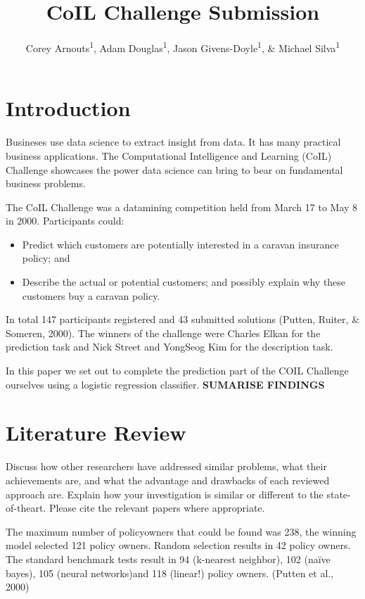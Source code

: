 \documentclass[man]{apa6}
\title{CoIL Challenge Submission}
\author{Corey Arnouts\textsuperscript{1}, Adam Douglas\textsuperscript{1}, Jason Givens-Doyle\textsuperscript{1}, \& Michael Silva\textsuperscript{1}}
\date{}
\affiliation{
\vspace{0.5cm}
\textsuperscript{1} CUNY School of Professional Studies}
\providecommand{\tightlist}{%
  \setlength{\itemsep}{0pt}\setlength{\parskip}{0pt}}
\begin{document}
\maketitle

\hypertarget{introduction}{%
\section{Introduction}\label{introduction}}

Busineses use data science to extract insight from data. It has many practical business applications. The Computational Intelligence and Learning (CoIL) Challenge showcases the power data science can bring to bear on fundamental business problems.

The CoIL Challenge was a datamining competition held from March 17 to May 8 in 2000. Participants could:

\begin{itemize}
\tightlist
\item
  Predict which customers are potentially interested in a caravan insurance policy; and
\item
  Describe the actual or potential customers; and possibly explain why these customers buy a caravan policy.
\end{itemize}

In total 147 participants registered and 43 submitted solutions (Putten, Ruiter, \& Someren, 2000). The winners of the challenge were Charles Elkan for the prediction task and Nick Street and YongSeog Kim for the description task.

In this paper we set out to complete the prediction part of the COIL Challenge ourselves using a logistic regression classifier. \textbf{SUMARISE FINDINGS}

\hypertarget{literature-review}{%
\section{Literature Review}\label{literature-review}}

Discuss how other researchers have addressed similar problems, what their achievements are, and what the advantage and drawbacks of each reviewed approach are. Explain how your investigation is similar or different to the state-of-theart. Please cite the relevant papers where appropriate.

The maximum number of policyowners that could be found was 238, the winning model selected 121 policy owners. Random selection results in 42 policy owners. The standard benchmark tests result in 94 (k-nearest neighbor), 102 (naïve bayes), 105 (neural networks)and 118 (linear!) policy owners. (Putten et al., 2000)
\end{document}
